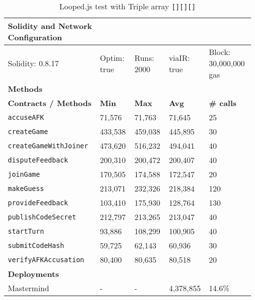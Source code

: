 \begin{table}[ht]
\centering
\begin{tabular}{|l|l|l|l|l|}
\hline
\textbf{Solidity and Network Configuration} & \multicolumn{4}{l|}{} \\ \hline
Solidity: 0.8.17 & Optim: true & Runs: 2000 & viaIR: true & Block: 30,000,000 gas \\ \hline
\textbf{Methods} & \multicolumn{4}{l|}{} \\ \hline
\textbf{Contracts / Methods} & \textbf{Min} & \textbf{Max} & \textbf{Avg} & \textbf{\# calls} \\ \hline

\texttt{accuseAFK} & 71,576 & 71,763 & 71,645 & 25 \\ \hline
\texttt{createGame} & 433,538 & 459,038 & 445,895 & 30 \\ \hline
\texttt{createGameWithJoiner} & 473,620 & 516,232 & 494,041 & 40 \\ \hline
\texttt{disputeFeedback} & 200,310 & 200,472 & 200,407 & 40 \\ \hline
\texttt{joinGame} & 170,505 & 174,588 & 172,547 & 20 \\ \hline
\texttt{makeGuess} & 213,071 & 232,326 & 218,384 & 120 \\ \hline
\texttt{provideFeedback} & 103,410 & 175,930 & 128,764 & 130 \\ \hline
\texttt{publishCodeSecret} & 212,797 & 213,265 & 213,047 & 40 \\ \hline
\texttt{startTurn} & 93,886 & 108,299 & 100,905 & 40 \\ \hline
\texttt{submitCodeHash} & 59,725 & 62,143 & 60,936 & 30 \\ \hline
\texttt{verifyAFKAccusation} & 80,400 & 80,635 & 80,518 & 20 \\ \hline
\textbf{Deployments} & \multicolumn{4}{l|}{} \\ \hline
Mastermind & - & - & 4,378,855 & 14.6\% \\ \hline
\end{tabular}
\caption{Looped.js test with Triple array \lstinline{[][][]}}
\label{tab:looped-1}
\end{table}

